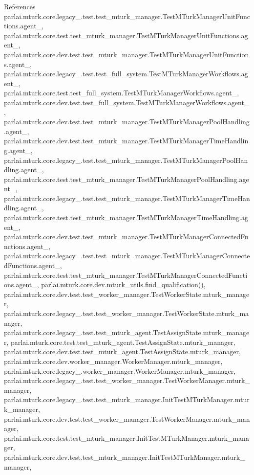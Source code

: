 References parlai.\+mturk.\+core.\+legacy\+\_.\+test.\+test\+\_\+mturk\+\_\+manager.\+Test\+M\+Turk\+Manager\+Unit\+Functions.\+agent\+\_, parlai.\+mturk.\+core.\+test.\+test\+\_\+mturk\+\_\+manager.\+Test\+M\+Turk\+Manager\+Unit\+Functions.\+agent\+\_, parlai.\+mturk.\+core.\+dev.\+test.\+test\+\_\+mturk\+\_\+manager.\+Test\+M\+Turk\+Manager\+Unit\+Functions.\+agent\+\_, parlai.\+mturk.\+core.\+legacy\+\_.\+test.\+test\+\_\+full\+\_\+system.\+Test\+M\+Turk\+Manager\+Workflows.\+agent\+\_, parlai.\+mturk.\+core.\+test.\+test\+\_\+full\+\_\+system.\+Test\+M\+Turk\+Manager\+Workflows.\+agent\+\_, parlai.\+mturk.\+core.\+dev.\+test.\+test\+\_\+full\+\_\+system.\+Test\+M\+Turk\+Manager\+Workflows.\+agent\+\_, parlai.\+mturk.\+core.\+dev.\+test.\+test\+\_\+mturk\+\_\+manager.\+Test\+M\+Turk\+Manager\+Pool\+Handling.\+agent\+\_, parlai.\+mturk.\+core.\+dev.\+test.\+test\+\_\+mturk\+\_\+manager.\+Test\+M\+Turk\+Manager\+Time\+Handling.\+agent\+\_, parlai.\+mturk.\+core.\+legacy\+\_.\+test.\+test\+\_\+mturk\+\_\+manager.\+Test\+M\+Turk\+Manager\+Pool\+Handling.\+agent\+\_, parlai.\+mturk.\+core.\+test.\+test\+\_\+mturk\+\_\+manager.\+Test\+M\+Turk\+Manager\+Pool\+Handling.\+agent\+\_, parlai.\+mturk.\+core.\+legacy\+\_.\+test.\+test\+\_\+mturk\+\_\+manager.\+Test\+M\+Turk\+Manager\+Time\+Handling.\+agent\+\_, parlai.\+mturk.\+core.\+test.\+test\+\_\+mturk\+\_\+manager.\+Test\+M\+Turk\+Manager\+Time\+Handling.\+agent\+\_, parlai.\+mturk.\+core.\+dev.\+test.\+test\+\_\+mturk\+\_\+manager.\+Test\+M\+Turk\+Manager\+Connected\+Functions.\+agent\+\_, parlai.\+mturk.\+core.\+legacy\+\_.\+test.\+test\+\_\+mturk\+\_\+manager.\+Test\+M\+Turk\+Manager\+Connected\+Functions.\+agent\+\_, parlai.\+mturk.\+core.\+test.\+test\+\_\+mturk\+\_\+manager.\+Test\+M\+Turk\+Manager\+Connected\+Functions.\+agent\+\_, parlai.\+mturk.\+core.\+dev.\+mturk\+\_\+utils.\+find\+\_\+qualification(), parlai.\+mturk.\+core.\+dev.\+test.\+test\+\_\+worker\+\_\+manager.\+Test\+Worker\+State.\+mturk\+\_\+manager, parlai.\+mturk.\+core.\+legacy\+\_.\+test.\+test\+\_\+worker\+\_\+manager.\+Test\+Worker\+State.\+mturk\+\_\+manager, parlai.\+mturk.\+core.\+legacy\+\_.\+test.\+test\+\_\+mturk\+\_\+agent.\+Test\+Assign\+State.\+mturk\+\_\+manager, parlai.\+mturk.\+core.\+test.\+test\+\_\+mturk\+\_\+agent.\+Test\+Assign\+State.\+mturk\+\_\+manager, parlai.\+mturk.\+core.\+dev.\+test.\+test\+\_\+mturk\+\_\+agent.\+Test\+Assign\+State.\+mturk\+\_\+manager, parlai.\+mturk.\+core.\+dev.\+worker\+\_\+manager.\+Worker\+Manager.\+mturk\+\_\+manager, parlai.\+mturk.\+core.\+legacy\+\_.\+worker\+\_\+manager.\+Worker\+Manager.\+mturk\+\_\+manager, parlai.\+mturk.\+core.\+legacy\+\_.\+test.\+test\+\_\+worker\+\_\+manager.\+Test\+Worker\+Manager.\+mturk\+\_\+manager, parlai.\+mturk.\+core.\+legacy\+\_.\+test.\+test\+\_\+mturk\+\_\+manager.\+Init\+Test\+M\+Turk\+Manager.\+mturk\+\_\+manager, parlai.\+mturk.\+core.\+dev.\+test.\+test\+\_\+worker\+\_\+manager.\+Test\+Worker\+Manager.\+mturk\+\_\+manager, parlai.\+mturk.\+core.\+test.\+test\+\_\+mturk\+\_\+manager.\+Init\+Test\+M\+Turk\+Manager.\+mturk\+\_\+manager, parlai.\+mturk.\+core.\+dev.\+test.\+test\+\_\+mturk\+\_\+manager.\+Init\+Test\+M\+Turk\+Manager.\+mturk\+\_\+manager, 